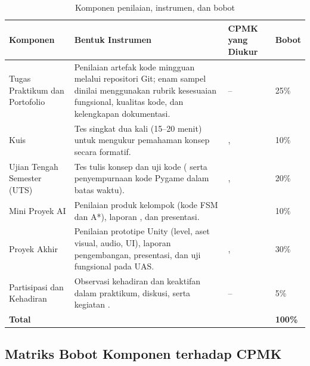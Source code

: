 \begin{table}[htbp]
\centering
\caption{Komponen penilaian, instrumen, dan bobot}
\label{tab:komponen-nilai}
\begin{tabularx}{\textwidth}{@{}L{3.6cm} Y L{2.5cm} C{1.6cm}@{}}
\toprule
\headrow \textbf{Komponen} & \textbf{Bentuk Instrumen} & \textbf{CPMK yang Diukur} & \textbf{Bobot} \\
\midrule
Tugas Praktikum dan Portofolio &
Penilaian artefak kode mingguan melalui repositori Git; enam sampel dinilai menggunakan rubrik kesesuaian fungsional, kualitas kode, dan kelengkapan dokumentasi. &
-- & 25\% \\
\addlinespace
Kuis &
Tes singkat dua kali (15--20 menit) untuk mengukur pemahaman konsep secara formatif. &
,  & 10\% \\
\addlinespace
Ujian Tengah Semester (UTS) &
Tes tulis konsep dan uji kode ( serta penyempurnaan kode Pygame dalam batas waktu). &
,  & 20\% \\
\addlinespace
Mini Proyek AI &
Penilaian produk kelompok (kode FSM dan A*), laporan , dan presentasi. &
 & 10\% \\
\addlinespace
Proyek Akhir &
Penilaian prototipe Unity (level, aset visual, audio, UI), laporan pengembangan, presentasi, dan uji fungsional pada UAS. &
,  & 30\% \\
\addlinespace
Partisipasi dan Kehadiran &
Observasi kehadiran dan keaktifan dalam praktikum, diskusi, serta kegiatan . &
-- & 5\% \\
\midrule
\textbf{Total} & & & \textbf{100\%} \\
\bottomrule
\end{tabularx}
\end{table}

\subsection{Matriks Bobot Komponen terhadap CPMK}

